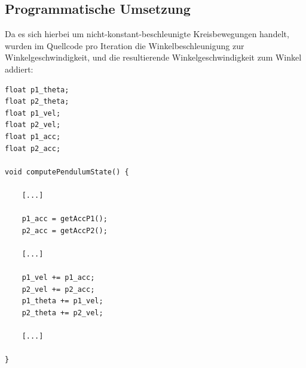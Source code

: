 \documentclass[titlepage, 11pt, a4paper, ngerman]{article}
\begin{document}
\subsection{Programmatische Umsetzung}
Da es sich hierbei um nicht-konstant-beschleunigte Kreisbewegungen handelt, wurden im Quellcode pro Iteration die Winkelbeschleunigung zur Winkelgeschwindigkeit, und die resultierende Winkelgeschwindigkeit zum Winkel addiert:
\begin{verbatim}
float p1_theta;
float p2_theta;
float p1_vel;
float p2_vel;
float p1_acc;
float p2_acc;

void computePendulumState() {

    [...]

    p1_acc = getAccP1();
    p2_acc = getAccP2();

    [...]

    p1_vel += p1_acc;
    p2_vel += p2_acc;
    p1_theta += p1_vel;
    p2_theta += p2_vel;

    [...]

}
\end{verbatim}
\end{document}

